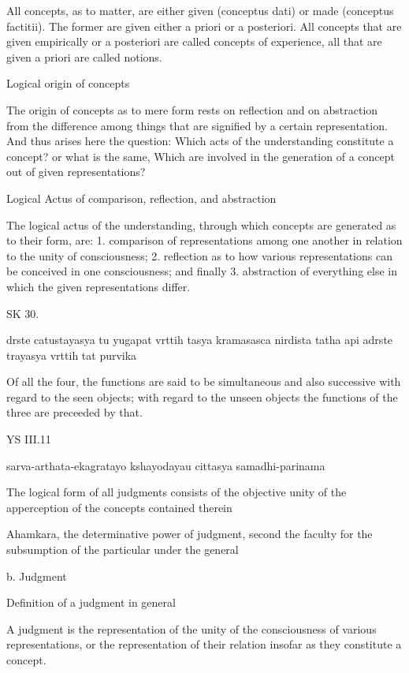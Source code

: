     All concepts, as to matter, are either
    given (conceptus dati) or made (conceptus factitii).
    The former are given either a priori or a posteriori.
    All concepts that are given empirically or a posteriori
    are called concepts of experience,
    all that are given a priori are called notions.

    Logical origin of concepts

    The origin of concepts as to mere form rests on reflection and on abstraction from
    the difference among things that are signified by a certain representation.
    And thus arises here the question: Which acts of the understanding constitute a concept? or
    what is the same, Which are involved in the generation of a concept out of given representations?

    Logical Actus of comparison, reflection, and abstraction

    The logical actus of the understanding,
    through which concepts are generated as to their form, are:
    1. comparison of representations among one another in relation to the unity of consciousness;
    2. reflection as to how various representations can be conceived in one consciousness; and finally
    3. abstraction of everything else in which the given representations differ.

SK 30.

drste catustayasya tu yugapat vrttih tasya kramasasca nirdista
tatha api adrste trayasya vrttih tat purvika

Of all the four, the functions are said to be simultaneous and also successive
with regard to the seen objects;
with regard to the unseen objects
the functions of the three are preceeded by that.

YS III.11

    sarva-arthata-ekagratayo kshayodayau cittasya samadhi-parinama

    The logical form of all judgments consists of the objective unity of
    the apperception of the concepts contained therein

    Ahamkara, the determinative power of judgment,
    second the faculty for the subsumption of the particular under the general

    b. Judgment

    Definition of a judgment in general

        A judgment is the representation of the unity of the consciousness of various representations,
        or the representation of their relation insofar as they constitute a concept.

